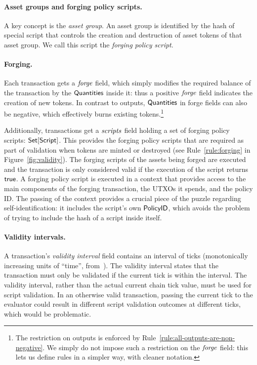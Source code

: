 \paragraph{Asset groups and forging policy scripts.}

A key concept is the \emph{asset group}.
An asset group is identified by the hash of special script that controls the creation and destruction of asset tokens of that asset group.
We call this script the \emph{forging policy script}.

\paragraph{Forging.}

Each transaction gets a $\mathit{forge}$ field, which simply modifies the required balance of the transaction by the $\textsf{Quantities}$ inside it: thus a positive $\mathit{forge}$ field indicates the creation of new tokens.
In contrast to outputs, $\textsf{Quantities}$ in forge fields can
also be negative, which effectively burns existing tokens.\footnote{
The restriction on outputs is enforced by Rule~\ref{rule:all-outputs-are-non-negative}.  We simply do not impose such a restriction on the $\mathit{forge}$ field: this lets us define rules in a simpler way, with cleaner notation. }

Additionally, transactions get a $\mathit{scripts}$ field holding a set of forging policy scripts: \(\textsf{Set}[\textsf{Script}]\).
This provides the forging policy scripts that are required as part of validation when tokens are minted or destroyed (see Rule~\ref{rule:forging} in Figure~\ref{fig:validity}). The forging scripts of the assets being forged are
executed and the transaction is only considered valid if the execution of the script returns $\textsf{true}$.
A forging policy script is executed in a context that provides access to the main components of the forging transaction, the UTXOs it spends, and the policy ID.
The passing of the context provides a crucial piece of the puzzle regarding self-identification: it includes the script's own $\textsf{PolicyID}$, which avoids the problem of trying to include the hash of a script inside itself.

\paragraph{Validity intervals.}
\label{para:validity-intervals}

A transaction's \emph{validity interval} field contains an interval of ticks (monotonically increasing units of ``time'', from~\cite{eutxo-1-paper}).
The validity interval states that the transaction must only be validated if the current tick is within the interval. The validity interval, rather than the actual current chain tick value, must be used
for script validation. In an otherwise valid transaction, passing the current
tick to the evaluator
could result in different script validation outcomes at different ticks, which
would be problematic.

